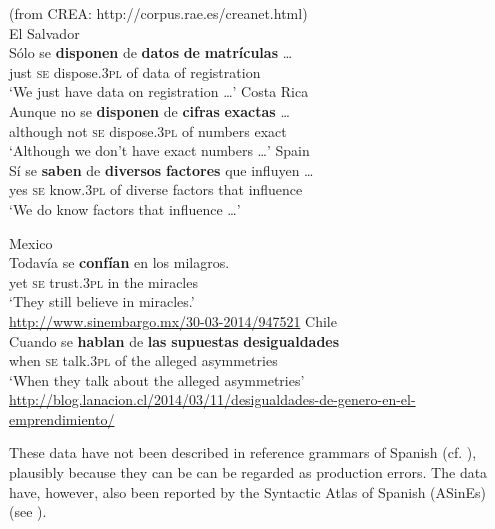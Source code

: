 \documentclass[output=paper]{langsci/langscibook}
\begin{document}
\ea%
    (from CREA: http://corpus.rae.es/creanet.html)\label{ex:gallego:28}\\
    \ea  El Salvador\\
    \gll Sólo se  \textbf{disponen}     de  \textbf{datos} \textbf{de}  \textbf{matrículas} …     \\
         just  \textsc{se}   dispose{}.\textsc{3pl} of  data    of  registration\\
    \glt ‘We just have data on registration …’
    \ex  Costa Rica\\
    \gll Aunque   no   se \textbf{disponen}      de  \textbf{cifras}       \textbf{exactas} …  \\
         although not \textsc{se}   dispose{}.\textsc{3pl}  of   numbers  exact\\
    \glt ‘Although we don’t have exact numbers …’
    \ex  Spain\\
    \gll   Sí   se  \textbf{saben}        de \textbf{diversos} \textbf{factores} que influyen …  \\
           yes \textsc{se}   know{}.\textsc{3pl}  of  diverse   factors    that influence\\
    \glt   ‘We do know factors that influence …’
    \z
\z    


\ea%
    \label{ex:gallego:29}
    \ea  Mexico\\
    \gll Todavía se   \textbf{confían}    en  los   milagros.\\
         yet         \textsc{se}   trust{}.\textsc{3pl}  in  the   miracles\\
    \glt ‘They still believe in miracles.’\\
    {\small\url{http://www.sinembargo.mx/30-03-2014/947521}}
    \ex  Chile\\
    \gll Cuando se   \textbf{hablan}    de  \textbf{las} \textbf{supuestas} \textbf{desigualdades} \\
         when     \textsc{se}   talk{}.\textsc{3pl}   of  the alleged      asymmetries\\
    \glt ‘When they talk about the alleged asymmetries’\\
    {\small\url{http://blog.lanacion.cl/2014/03/11/desigualdades-de-genero-en-el-emprendimiento/}}
    \z
\z    

These data have not been described in reference grammars of Spanish (cf. \citealt{Bosque1999,RAE-ASALE2009}), plausibly because they can be can be regarded as production errors. The data have, however, also been reported by the Syntactic Atlas of Spanish (ASinEs) (see ).
\end{document}
